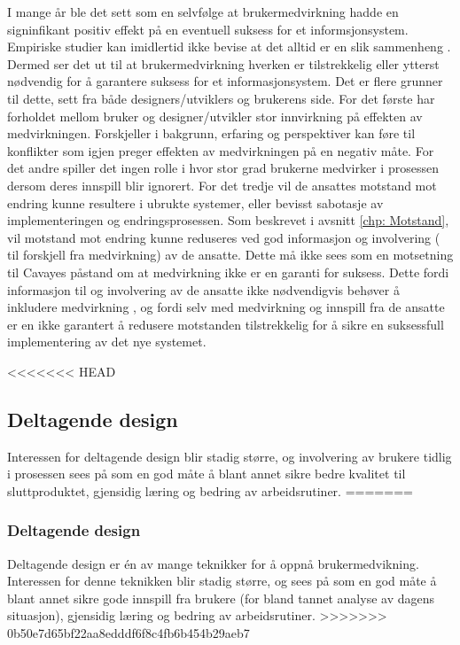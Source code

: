 \noindent
I mange år ble det sett som en selvfølge at brukermedvirkning hadde en signinfikant positiv effekt på en eventuell suksess for et informsjonsystem. Empiriske studier kan imidlertid ikke bevise at det alltid er en slik sammenheng \cite{Cavaye95}. Dermed ser det ut til at brukermedvirkning hverken er tilstrekkelig eller ytterst nødvendig for å garantere suksess for et informasjonsystem. 
Det er flere grunner til dette, sett fra både designers/utviklers og brukerens side. For det første har forholdet mellom bruker og designer/utvikler stor innvirkning på effekten av medvirkningen. Forskjeller i bakgrunn, erfaring og perspektiver kan føre til konflikter som igjen preger effekten av medvirkningen på en negativ måte. For det andre spiller det ingen rolle i hvor stor grad brukerne medvirker i prosessen dersom deres innspill blir ignorert. For det tredje vil de ansattes motstand mot endring kunne resultere i ubrukte systemer, eller bevisst sabotasje av implementeringen og endringsprosessen. Som beskrevet i avsnitt \ref{chp: Motstand}, vil motstand mot endring kunne reduseres ved god informasjon og involvering ( til forskjell fra medvirkning) av de ansatte. Dette må ikke sees som en motsetning til Cavayes påstand om at medvirkning ikke er en garanti for suksess. Dette fordi informasjon til og involvering av de ansatte ikke nødvendigvis behøver å inkludere medvirkning \cite{Cavaye95}, og fordi selv med medvirkning og innspill fra de ansatte er en ikke garantert å redusere motstanden tilstrekkelig for å sikre en suksessfull implementering av det nye systemet.

<<<<<<< HEAD
\subsection{Deltagende design}
\label{chp: dd}

Interessen for deltagende design blir stadig større, og involvering av brukere tidlig i prosessen sees på som en god måte å blant annet sikre bedre kvalitet til sluttproduktet, gjensidig læring og bedring av arbeidsrutiner.
=======
\subsubsection{Deltagende design}
Deltagende design er én av mange teknikker for å oppnå brukermedvikning.
Interessen for denne teknikken blir stadig større, og sees på som en god måte å blant annet sikre gode innspill fra brukere (for bland tannet analyse av dagens situasjon), gjensidig læring og bedring av arbeidsrutiner.
>>>>>>> 0b50e7d65bf22aa8edddf6f8c4fb6b454b29aeb7

